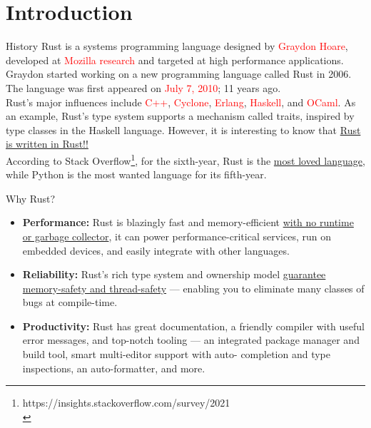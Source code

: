 \documentclass[10pt,xcolor={dvipsnames}, aspectratio=169]{beamer}
\begin{document}
\section{Introduction}
    \begin{frame}
    \end{frame}
	\begin{frame}{History}
		Rust is a systems programming language designed by \textcolor{red}{Graydon Hoare}, developed at \textcolor{red}{Mozilla research} and targeted at high performance applications. Graydon started working on a new programming language called Rust in 2006. The language was first appeared on \textcolor{red}{July 7, 2010}; 11 years ago.
		~\\Rust's major influences include \textcolor{red}{C++}, \textcolor{red}{Cyclone}, \textcolor{red}{Erlang}, \textcolor{red}{Haskell}, and \textcolor{red}{OCaml}. As an example, Rust's type system supports a mechanism called traits, inspired by type classes in the Haskell language. However, it is interesting to know that \underline{Rust is written in Rust!!}
		~\\According to Stack Overflow\footnote{https://insights.stackoverflow.com/survey/2021\\}, for the sixth-year, Rust is the \underline{most loved language}, while Python is the most wanted language for its fifth-year.
	\end{frame}
	\begin{frame}{Why Rust?}
		\begin{itemize}
			\item[\checkmark] \textbf{Performance:} Rust is blazingly fast and memory-efficient \ul{with no runtime or garbage collector}, it can power performance-critical services, run on embedded devices, and easily integrate with other 
			languages.
			\item[\checkmark] \textbf{Reliability:} Rust’s rich type system and ownership model \ul{guarantee memory-safety and thread-safety} — enabling you to eliminate many classes of bugs at compile-time.
			\item[\checkmark] \textbf{Productivity:} Rust has great documentation, a friendly compiler with useful error messages, and top-notch tooling — an integrated package manager and build tool, smart multi-editor support with auto-
			completion and type inspections, an auto-formatter, and more.
		\end{itemize}
	\end{frame}
\end{document}
